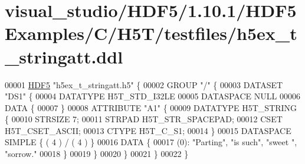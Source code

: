 \hypertarget{visual__studio_2_h_d_f5_21_810_81_2_h_d_f5_examples_2_c_2_h5_t_2testfiles_2h5ex__t__stringatt_8ddl_source}{}\section{visual\+\_\+studio/\+H\+D\+F5/1.10.1/\+H\+D\+F5\+Examples/\+C/\+H5\+T/testfiles/h5ex\+\_\+t\+\_\+stringatt.ddl}
\label{visual__studio_2_h_d_f5_21_810_81_2_h_d_f5_examples_2_c_2_h5_t_2testfiles_2h5ex__t__stringatt_8ddl_source}

\begin{DoxyCode}
00001 \hyperlink{namespace_h_d_f5}{HDF5} \textcolor{stringliteral}{"h5ex\_t\_stringatt.h5"} \{
00002 GROUP \textcolor{stringliteral}{"/"} \{
00003    DATASET \textcolor{stringliteral}{"DS1"} \{
00004       DATATYPE  H5T\_STD\_I32LE
00005       DATASPACE  NULL
00006       DATA \{
00007       \}
00008       ATTRIBUTE \textcolor{stringliteral}{"A1"} \{
00009          DATATYPE  H5T\_STRING \{
00010             STRSIZE 7;
00011             STRPAD H5T\_STR\_SPACEPAD;
00012             CSET H5T\_CSET\_ASCII;
00013             CTYPE H5T\_C\_S1;
00014          \}
00015          DATASPACE  SIMPLE \{ ( 4 ) / ( 4 ) \}
00016          DATA \{
00017          (0): \textcolor{stringliteral}{"Parting"}, \textcolor{stringliteral}{"is such"}, \textcolor{stringliteral}{"sweet  "}, \textcolor{stringliteral}{"sorrow."}
00018          \}
00019       \}
00020    \}
00021 \}
00022 \}
\end{DoxyCode}
